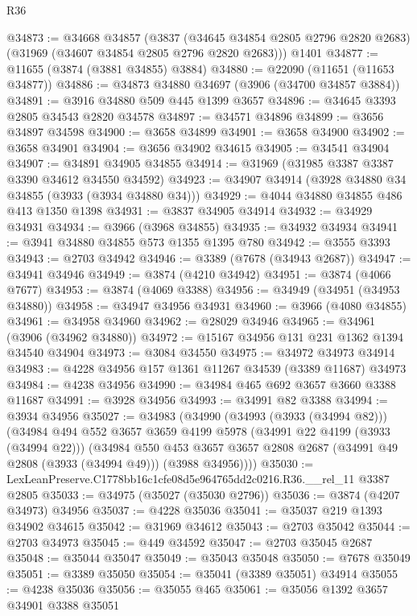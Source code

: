 \begin{lexlean}{R36}
\begin{coremodule}
@34873 := @34668
    @34857
    (@3837 (@34645 @34854 @2805 @2796 @2820 @2683) (@31969 (@34607 @34854 @2805 @2796 @2820 @2683)))
    @1401
@34877 := @11655 (@3874 (@3881 @34855) @3884)
@34880 := @22090 (@11651 (@11653 @34877))
@34886 := @34873 @34880 @34697 (@3906 (@34700 @34857 @3884))
@34891 := @3916 @34880 @509 @445 @1399 @3657
@34896 := @34645 @3393 @2805 @34543 @2820 @34578
@34897 := @34571 @34896
@34899 := @3656 @34897 @34598
@34900 := @3658 @34899
@34901 := @3658 @34900
@34902 := @3658 @34901
@34904 := @3656 @34902 @34615
@34905 := @34541 @34904
@34907 := @34891 @34905 @34855
@34914 := @31969 (@31985 @3387 @3387 @3390 @34612 @34550 @34592)
@34923 := @34907 @34914 (@3928 @34880 @34 @34855 (@3933 (@3934 @34880 @34)))
@34929 := @4044 @34880 @34855 @486 @413 @1350 @1398
@34931 := @3837 @34905 @34914
@34932 := @34929 @34931
@34934 := @3966 (@3968 @34855)
@34935 := @34932 @34934
@34941 := @3941 @34880 @34855 @573 @1355 @1395 @780
@34942 := @3555 @3393
@34943 := @2703 @34942
@34946 := @3389 (@7678 (@34943 @2687))
@34947 := @34941 @34946
@34949 := @3874 (@4210 @34942)
@34951 := @3874 (@4066 @7677)
@34953 := @3874 (@4069 @3388)
@34956 := @34949 (@34951 (@34953 @34880))
@34958 := @34947 @34956 @34931
@34960 := @3966 (@4080 @34855)
@34961 := @34958 @34960
@34962 := @28029 @34946
@34965 := @34961 (@3906 (@34962 @34880))
@34972 := @15167 @34956 @131 @231 @1362 @1394 @34540 @34904
@34973 := @3084 @34550
@34975 := @34972 @34973 @34914
@34983 := @4228 @34956 @157 @1361 @11267 @34539 (@3389 @11687) @34973
@34984 := @4238 @34956
@34990 := @34984 @465 @692 @3657 @3660 @3388 @11687
@34991 := @3928 @34956
@34993 := @34991 @82 @3388
@34994 := @3934 @34956
@35027 := @34983
    (@34990
      (@34993 (@3933 (@34994 @82)))
      (@34984
        @494
        @552
        @3657
        @3659
        @4199
        @5978
        (@34991 @22 @4199 (@3933 (@34994 @22)))
        (@34984
          @550
          @453
          @3657
          @3657
          @2808
          @2687
          (@34991 @49 @2808 (@3933 (@34994 @49)))
          (@3988 @34956))))
@35030 := LexLeanPreserve.C1778bb16c1cfe08d5e964765dd2c0216.R36.__rel_11 @3387 @2805
@35033 := @34975 (@35027 (@35030 @2796))
@35036 := @3874 (@4207 @34973) @34956
@35037 := @4228 @35036
@35041 := @35037 @219 @1393 @34902 @34615
@35042 := @31969 @34612
@35043 := @2703 @35042
@35044 := @2703 @34973
@35045 := @449 @34592
@35047 := @2703 @35045 @2687
@35048 := @35044 @35047
@35049 := @35043 @35048
@35050 := @7678 @35049
@35051 := @3389 @35050
@35054 := @35041 (@3389 @35051) @34914
@35055 := @4238 @35036
@35056 := @35055 @465
@35061 := @35056 @1392 @3657 @34901 @3388 @35051

\end{coremodule}
\end{lexlean}
